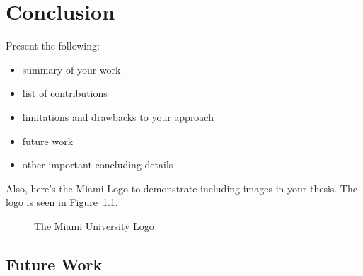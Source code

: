 \chapter{Conclusion}

Present the following:

\begin{itemize}
    \item summary of your work
    \item list of contributions
    \item limitations and drawbacks to your approach
    \item future work
    \item other important concluding details
\end{itemize}

Also, here's the Miami Logo to demonstrate including images in your thesis.
The logo is seen in Figure~\ref{fig:MiamiLogo}.

\begin{figure}[h]
    \centering
    \caption{The Miami University Logo}
    \label{fig:MiamiLogo}
\end{figure}

\section{Future Work}
